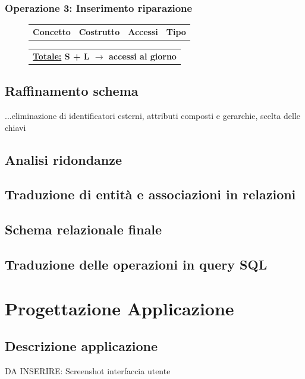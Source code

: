 \documentclass[a4paper,12pt]{report}
\begin{document}
\subsection*{Operazione 3: Inserimento riparazione}
\begin{figure}[ht]
	\centering
	\begin{tabular}{L{3cm}C{2.5cm}C{4.5cm}C{2.5cm}}
		\rule[-2mm]{0mm}{0.65cm}{}
		\textbf{Concetto} & \textbf{Costrutto} &\textbf{Accessi} & \textbf{Tipo} \\

	\end{tabular}
	
	\begin{tabular}{C{13.9cm}}
		\rule[-2.5mm]{0mm}{0.8cm}{}	
		 \textbf{\underline{Totale:} S + L $\to$  accessi al giorno}
	\end{tabular}
\end{figure}

\section{Raffinamento schema}
...eliminazione di identificatori esterni, attributi composti e gerarchie, scelta delle chiavi

\section{Analisi ridondanze}

\section{Traduzione di entità e associazioni in relazioni}

\section{Schema relazionale finale}

\section{Traduzione delle operazioni in query SQL}

\chapter{Progettazione Applicazione}

\section{Descrizione applicazione}

DA INSERIRE: Screenshot interfaccia utente
\end{document}
